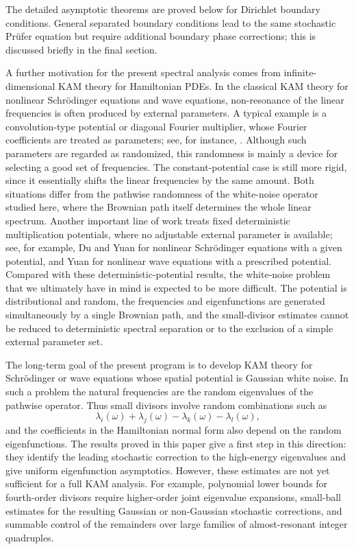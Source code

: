 \documentclass[11pt]{article}
\begin{document}
The detailed asymptotic theorems are proved below for Dirichlet boundary conditions. General separated boundary conditions lead to the same stochastic Pr\"ufer equation but require additional boundary phase corrections; this is discussed briefly in the final section.

A further motivation for the present spectral analysis comes from infinite-dimensional KAM theory for Hamiltonian PDEs. In the classical KAM theory for nonlinear Schr\"odinger equations and wave equations, non-resonance of the linear frequencies is often produced by external parameters. A typical example is a convolution-type potential or diagonal Fourier multiplier, whose Fourier coefficients are treated as parameters; see, for instance, \cite{Kuksin1993,KuksinPoeschel1996}. Although such parameters are regarded as randomized, this randomness is mainly a device for selecting a good set of frequencies. The constant-potential case is still more rigid, since it essentially shifts the linear frequencies by the same amount. Both situations differ from the pathwise randomness of the white-noise operator studied here, where the Brownian path itself determines the whole linear spectrum. Another important line of work treats fixed deterministic multiplication potentials, where no adjustable external parameter is available; see, for example, Du and Yuan \cite{DuYuan2006} for nonlinear Schr\"odinger equations with a given potential, and Yuan \cite{Yuan2006WavePotential} for nonlinear wave equations with a prescribed potential. Compared with these deterministic-potential results, the white-noise problem that we ultimately have in mind is expected to be more difficult. The potential is distributional and random, the frequencies and eigenfunctions are generated simultaneously by a single Brownian path, and the small-divisor estimates cannot be reduced to deterministic spectral separation or to the exclusion of a simple external parameter set.

The long-term goal of the present program is to develop KAM theory for Schr\"odinger or wave equations whose spatial potential is Gaussian white noise. In such a problem the natural frequencies are the random eigenvalues of the pathwise operator. Thus small divisors involve random combinations such as
\[
    \lambda_i(\omega)+\lambda_j(\omega)-\lambda_k(\omega)-\lambda_l(\omega),
\]
and the coefficients in the Hamiltonian normal form also depend on the random eigenfunctions. The results proved in this paper give a first step in this direction: they identify the leading stochastic correction to the high-energy eigenvalues and give uniform eigenfunction asymptotics. However, these estimates are not yet sufficient for a full KAM analysis. For example, polynomial lower bounds for fourth-order divisors require higher-order joint eigenvalue expansions, small-ball estimates for the resulting Gaussian or non-Gaussian stochastic corrections, and summable control of the remainders over large families of almost-resonant integer quadruples.
\end{document}
